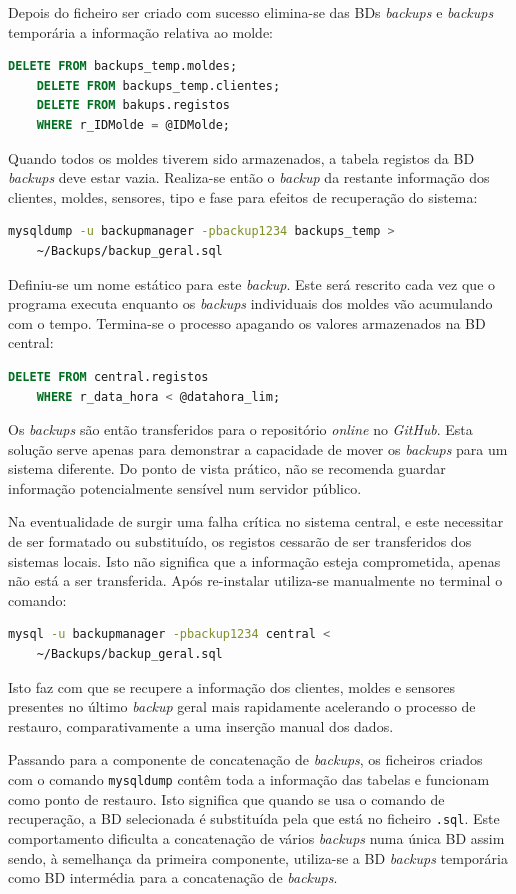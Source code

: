 \documentclass[11pt,twoside,a4paper]{report}
\begin{document}
Depois do ficheiro ser criado com sucesso elimina-se das BDs \textit{backups} e \textit{backups} temporária a informação relativa ao molde:
\begin{lstlisting}[language = SQL]
	DELETE FROM backups_temp.moldes;
	DELETE FROM backups_temp.clientes;
	DELETE FROM bakups.registos
	WHERE r_IDMolde = @IDMolde;
\end{lstlisting}
Quando todos os moldes tiverem sido armazenados, a tabela registos da BD \textit{backups} deve estar vazia. Realiza-se então o \textit{backup} da restante informação dos clientes, moldes, sensores, tipo e fase para efeitos de recuperação do sistema:
\begin{lstlisting}[language = bash]
	mysqldump -u backupmanager -pbackup1234 backups_temp >
	~/Backups/backup_geral.sql
\end{lstlisting}
Definiu-se um nome estático para este \textit{backup}. Este será rescrito cada vez que o programa executa enquanto os \textit{backups} individuais dos moldes vão acumulando com o tempo. Termina-se o processo apagando os valores armazenados na BD central:
\begin{lstlisting}[language = SQL]
	DELETE FROM central.registos
	WHERE r_data_hora < @datahora_lim;
\end{lstlisting}
Os \textit{backups} são então transferidos para o repositório \textit{online} no \textit{GitHub}. Esta solução serve apenas para demonstrar a capacidade de mover os \textit{backups} para um sistema diferente. Do ponto de vista prático, não se recomenda guardar informação potencialmente sensível num servidor público.\par 
Na eventualidade de surgir uma falha crítica no sistema central, e este necessitar de ser formatado ou substituído, os registos cessarão de ser transferidos dos sistemas locais. Isto não significa que a informação esteja comprometida, apenas não está a ser transferida. Após re-instalar utiliza-se manualmente no terminal o comando:
\begin{lstlisting}[language = bash]
	mysql -u backupmanager -pbackup1234 central <
	~/Backups/backup_geral.sql
\end{lstlisting}
Isto faz com que se recupere a informação dos clientes, moldes e sensores presentes no último \textit{backup} geral mais rapidamente acelerando o processo de restauro, comparativamente a uma inserção manual dos dados.\par 
Passando para a componente de concatenação de \textit{backups}, os ficheiros criados com o comando \texttt{mysqldump} contêm toda a informação das tabelas e funcionam como ponto de restauro. Isto significa que quando se usa o comando de recuperação, a BD selecionada é substituída pela que está no ficheiro \texttt{.sql}. Este comportamento dificulta a concatenação de vários \textit{backups} numa única BD assim sendo, à semelhança da primeira componente, utiliza-se a BD \textit{backups} temporária como BD intermédia para a concatenação de \textit{backups}.\par 
\end{document}
